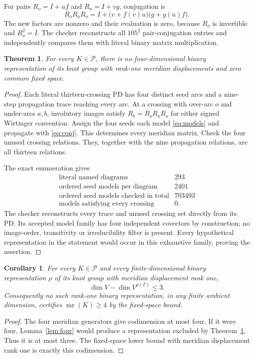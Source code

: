 \documentclass[11pt]{article}
\newtheorem{theorem}[lemma]{Theorem}
\newtheorem{corollary}[lemma]{Corollary}
\newcommand{\mr}{\operatorname{mr}}
\begin{document}
For pairs $R_o=I+uf$ and $R_a=I+vg$, conjugation is
\begin{equation}\label{eq:conj}
 R_oR_aR_o
  =I+\bigl(v+f(v)u\bigr)\bigl(g+g(u)f\bigr).
\end{equation}
The new factors are nonzero and their evaluation is zero, because
$R_o$ is invertible and $R_o^2=I$.
The checker reconstructs all $105^2$ pair-conjugation entries and
independently compares them with literal binary matrix multiplication.

\begin{theorem}\label{thm:finite}
For every $K\in\mathcal P$, there is no four-dimensional binary
representation of its knot group with rank-one meridian
displacements and zero common fixed space.
\end{theorem}
\begin{proof}
Each literal thirteen-crossing PD has four distinct seed arcs and a
nine-step propagation trace reaching every arc. At a crossing with
over-arc $o$ and under-arcs $a,b$, involutory images satisfy
$R_b=R_oR_aR_o$ for either signed Wirtinger convention.
Assign the four seeds each model \eqref{eq:models} and propagate
with \eqref{eq:conj}. This determines every meridian matrix.
Check the four unused crossing relations. They, together with the
nine propagation relations, are all thirteen relations.

The exact enumeration gives
\[
\begin{array}{l|r}
\text{literal named diagrams}&293\\
\text{ordered seed models per diagram}&2401\\
\text{ordered seed models checked in total}&703493\\
\text{models satisfying every crossing}&0.
\end{array}
\]
The checker reconstructs every trace and unused crossing set directly
from its PD. Its accepted model family has four independent
covectors by construction; no image-order, transitivity or
irreducibility filter is present. Every hypothetical representation
in the statement would occur in this exhaustive family, proving
the assertion.
\end{proof}

\begin{corollary}\label{cor:boundary}
For every $K\in\mathcal P$ and every finite-dimensional binary
representation $\rho$ of its knot group with meridian displacement
rank one,
\[
                     \dim V-\dim V^{\rho(\Gamma)}\le3.
\]
Consequently no such rank-one binary representation, in any finite
ambient dimension, certifies $\mr(K)\ge4$ by the fixed-space bound.
\end{corollary}
\begin{proof}
The four meridian generators give codimension at most four.
If it were four, Lemma~\ref{lem:four} would produce a representation
excluded by Theorem~\ref{thm:finite}. Thus it is at most three.
The fixed-space lower bound with meridian displacement rank one is
exactly this codimension.
\end{proof}
\end{document}
